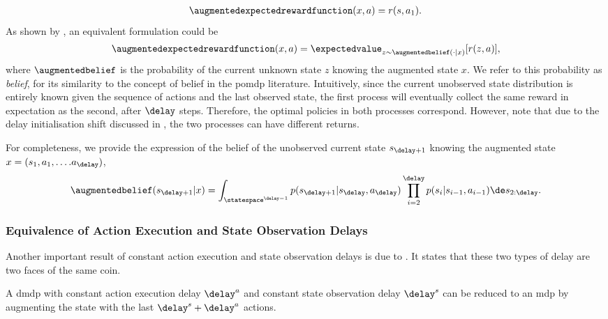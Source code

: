 \begin{align}
\label{eq:delayed_reward_deterministic}
    \augmentedexpectedrewardfunction(x,a) = r(s,a_1).
\end{align}
As shown by \cite[Lemma~1]{katsikopoulos2003markov}, an equivalent formulation could be
\begin{align}
\label{eq:delayed_reward_expected}
    \augmentedexpectedrewardfunction(x,a) = \expectedvalue_{z\sim \augmentedbelief(\cdot\vert x)} [r(z,a)],
\end{align}
where $\augmentedbelief$ is the probability of the current unknown state $z$ knowing the augmented state $x$. We refer to this probability as \emph{belief}, for its similarity to the concept of belief in the \gls{pomdp} literature. 
Intuitively, since the current unobserved state distribution is entirely known given the sequence of actions and the last observed state, the first process will eventually collect the same reward in expectation as the second, after $\delay$ steps.
Therefore, the optimal policies in both processes correspond. 
However, note that due to the delay initialisation shift discussed in , the two processes can have different returns. 

For completeness, we provide the expression of the belief of the unobserved current state $s_{\delay+1}$ knowing the augmented state $x=(s_1,a_1,\dots.a_\delay)$,
\begin{align}
\label{eq:belief_def}
    \augmentedbelief(s_{\delay+1}\vert x)=\int_{\statespace^{\delay-1}}p(s_{\delay+1}\vert s_\delay,a_\delay)\prod_{i=2}^\delay p(s_i|s_{i-1},a_{i-1})\de s_{2:\delay}.
\end{align}

\subsubsection{Equivalence of Action Execution and State Observation Delays}
\label{subsubsec:equiv_action_state_delays}
Another important result of constant action execution and state observation delays is due to \cite{katsikopoulos2003markov}. 
It states that these two types of delay are two faces of the same coin. 

\begin{prop}
    A \gls{dmdp} with constant action execution delay $\delay^a$ and constant state observation delay $\delay^s$ can be reduced to an \gls{mdp} by augmenting the state with the last $\delay^s+\delay^a$ actions.
\end{prop}

